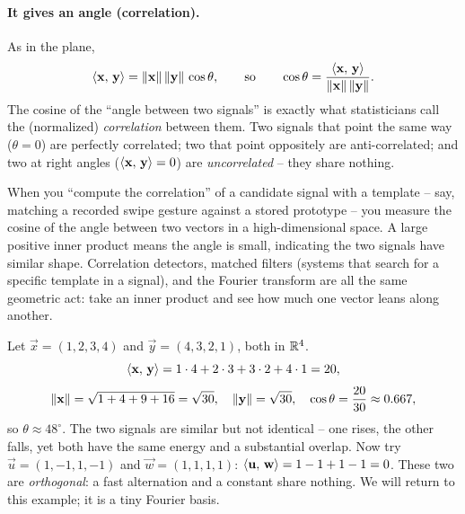 \paragraph{It gives an angle (correlation).} As in the plane,
\[
  \langle \mathbf{x},\, \mathbf{y} \rangle = \lVert\mathbf{x}\rVert\,\lVert\mathbf{y}\rVert\,\cos\theta,
  \qquad\text{so}\qquad
  \cos\theta = \frac{\langle \mathbf{x},\, \mathbf{y} \rangle}{\lVert\mathbf{x}\rVert\,\lVert\mathbf{y}\rVert}.
\]
The cosine of the ``angle between two signals'' is exactly what statisticians call the (normalized)
\emph{correlation} between them. Two signals that point the same way ($\theta=0$) are perfectly
correlated; two that point oppositely are anti-correlated; and two at right angles
($\langle \mathbf{x},\, \mathbf{y} \rangle=0$) are \emph{uncorrelated} -- they share nothing.

\begin{happeningbox}
When you ``compute the correlation'' of a candidate signal with a template -- say, matching a
recorded swipe gesture against a stored prototype -- you measure the cosine of the
angle between two vectors in a high-dimensional space. A large positive inner product means
the angle is small, indicating the two signals have similar shape. Correlation
detectors, matched filters (systems that search for a specific template in a signal), and the Fourier transform are all the same geometric act: take an
inner product and see how much one vector leans along another.
\end{happeningbox}

\begin{example}
\label{ch03:ex-inner}
Let $\vec{x}=(1,2,3,4)$ and $\vec{y}=(4,3,2,1)$, both in $\mathbb{R}^4$.
\[
  \langle \mathbf{x},\, \mathbf{y} \rangle = 1\cdot4 + 2\cdot3 + 3\cdot2 + 4\cdot1 = 20,
\]
\[
  \lVert\mathbf{x}\rVert = \sqrt{1+4+9+16}=\sqrt{30},\quad \lVert\mathbf{y}\rVert=\sqrt{30},
  \quad \cos\theta = \frac{20}{30}\approx 0.667,
\]
so $\theta\approx 48^\circ$. The two signals are similar but not identical -- one rises, the other
falls, yet both have the same energy and a substantial overlap. Now try $\vec{u}=(1,-1,1,-1)$ and
$\vec{w}=(1,1,1,1)$: $\langle \mathbf{u},\, \mathbf{w} \rangle = 1-1+1-1 = 0$. These two are \emph{orthogonal}: a
fast alternation and a constant share nothing. We will return to this example; it is a tiny Fourier basis.
\end{example}

